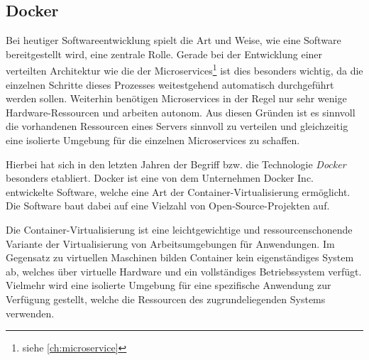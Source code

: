\subsection{Docker}
\label{sec:grundlagen:docker}
Bei heutiger Softwareentwicklung spielt die Art und Weise, wie eine Software bereitgestellt wird, eine zentrale Rolle. 
Gerade bei der Entwicklung einer verteilten Architektur wie die der Microservices\footnote{siehe \ref{ch:microservice}} ist dies besonders wichtig, da die einzelnen Schritte dieses Prozesses weitestgehend automatisch durchgeführt werden sollen. 
Weiterhin benötigen Microservices in der Regel nur sehr wenige Hardware-Ressourcen und arbeiten autonom. 
Aus diesen Gründen ist es sinnvoll die vorhandenen Ressourcen eines Servers sinnvoll zu verteilen und gleichzeitig eine isolierte Umgebung für die einzelnen Microservices zu schaffen.

Hierbei hat sich in den letzten Jahren der Begriff bzw. die Technologie \emph{Docker} besonders etabliert.
Docker ist eine von dem Unternehmen Docker Inc. entwickelte Software, welche eine Art der Container-Virtualisierung ermöglicht. 
Die Software baut dabei auf eine Vielzahl von Open-Source-Projekten auf.

Die Container-Virtualisierung ist eine leichtgewichtige und ressourcenschonende Variante der Virtualisierung von Arbeitsumgebungen für Anwendungen. 
Im Gegensatz zu virtuellen Maschinen bilden Container kein eigenständiges System ab, welches über virtuelle Hardware und ein vollständiges Betriebssystem verfügt. 
Vielmehr wird eine isolierte Umgebung für eine spezifische Anwendung zur Verfügung gestellt, welche die Ressourcen des zugrundeliegenden Systems verwenden. 


